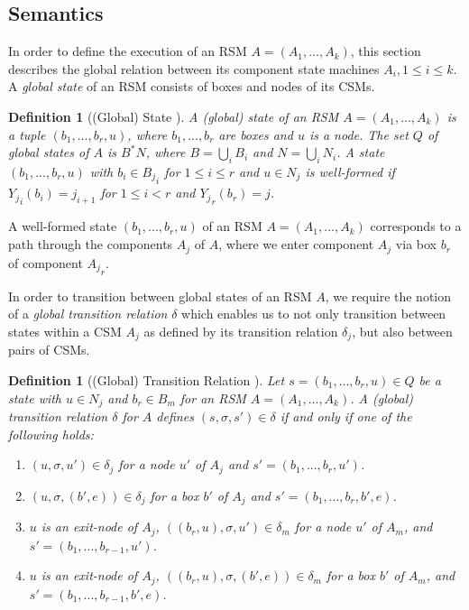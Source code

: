 \documentclass[a4paper, 12pt, twoside]{report}
\theoremstyle{plain}
\newtheorem{definition}[theorem]{Definition}
\begin{document}
	\subsection{Semantics}
	In order to define the execution of an RSM $A=(A_1, ..., A_k)$, this section describes the global relation between its component state machines $A_i, 1 \leq i \leq k$. A \textit{global state} of an RSM consists of boxes and nodes of its CSMs.
	
	\begin{definition}[(Global) State \cite{alur2001analysis}]\label{def:rsm_semantics}
		A \textup{(global) state} of an RSM $A=(A_1, ..., A_k)$ is a tuple $(b_1, ..., b_r, u)$, where $b_1, ..., b_r$ are boxes and $u$ is a node. The set $Q$ of global states of $A$ is $B^*N$, where $B=\bigcup_iB_i$ and $N=\bigcup_iN_i$. A state $(b_1, ..., b_r, u)$ with $b_i \in {B_j}_i$ for $1 \leq i \leq r$ and $u \in N_j$ is \textup{well-formed} if ${Y_j}_i(b_i) = j_{i+1}$ for $1 \leq i < r$ and ${Y_j}_r(b_r) = j$.
	\end{definition}

	
	A well-formed state $(b_1, ..., b_r, u)$ of an RSM $A=(A_1, ..., A_k)$ corresponds to a path through the components $A_j$ of $A$, where we enter component $A_j$ via box $b_r$ of component ${A_j}_r$.
	
	
	In order to transition between global states of an RSM $A$, we require the notion of a \textit{global transition relation} $\delta$ which enables us to not only transition between states within a CSM $A_j$ as defined by its transition relation $\delta_j$, but also between pairs of CSMs.
	
	\begin{definition}[(Global) Transition Relation \cite{alur2001analysis}]\label{def:rsm_transitionRelation}
		Let $s=(b_1, ..., b_r, u) \in Q$ be a state with $u\in N_j$ and $b_r \in B_m$ for an RSM $A=(A_1, ..., A_k)$. A \textup{(global) transition relation} $\delta$ for $A$ defines $(s, \sigma, s') \in \delta$ if and only if one of the following holds:
		\begin{enumerate}
			\item $(u, \sigma, u') \in \delta_j$ for a node $u'$ of $A_j$ and $s'=(b_1, ..., b_r, u')$.
			\item $(u, \sigma, (b',e))\in \delta_j$ for a box $b'$ of $A_j$ and $s'=(b_1, ..., b_r, b', e)$.
			\item $u$ is an exit-node of $A_j$, $((b_r, u), \sigma, u') \in \delta_m$ for a node $u'$ of $A_m$, and $s'=(b_1, ..., b_{r-1}, u')$.
			\item $u$ is an exit-node of $A_j$, $((b_r, u), \sigma, (b',e)) \in \delta_m$ for a box $b'$ of $A_m$, and $s'=(b_1, ..., b_{r-1}, b', e)$.
		\end{enumerate}
	\end{definition}
\end{document}
